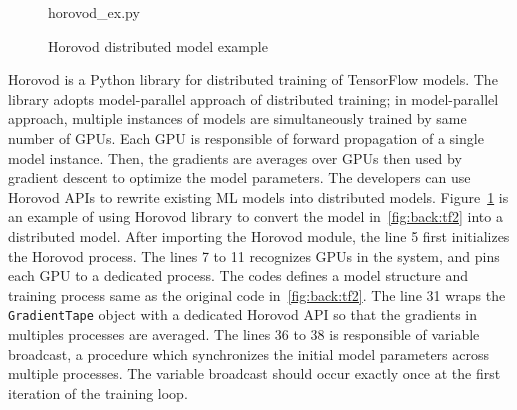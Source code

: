 \begin{figure}
 
{horovod_ex.py}
  \caption{Horovod distributed model example}
\label{fig:back:hvd} 
\end{figure}

Horovod is a Python library for distributed training of TensorFlow models.
The library adopts model-parallel approach of distributed training;
in model-parallel approach, multiple instances of models are simultaneously
trained by same number of GPUs.
Each GPU is responsible of forward propagation of a single model instance.
Then, the gradients are averages over GPUs then used by gradient descent
to optimize the model parameters. 
The developers can use Horovod APIs to rewrite existing ML models into
distributed models.
Figure~\ref{fig:back:hvd} is an example of using Horovod library to convert
the model in~\ref{fig:back:tf2} into a distributed model.
After importing the Horovod module, the line 5 first initializes the
Horovod process. 
The lines 7 to 11 recognizes GPUs in the system, and pins each GPU to
a dedicated process.
The codes defines a model structure and training process same as the original
code in~\ref{fig:back:tf2}.
The line 31 wraps the {\tt GradientTape} object with a dedicated 
Horovod API so that the gradients in multiples processes are averaged.
The lines 36 to 38 is responsible of variable broadcast, a procedure which
synchronizes the initial model parameters across multiple processes.
The variable broadcast should occur exactly once at the first iteration of
the training loop.
